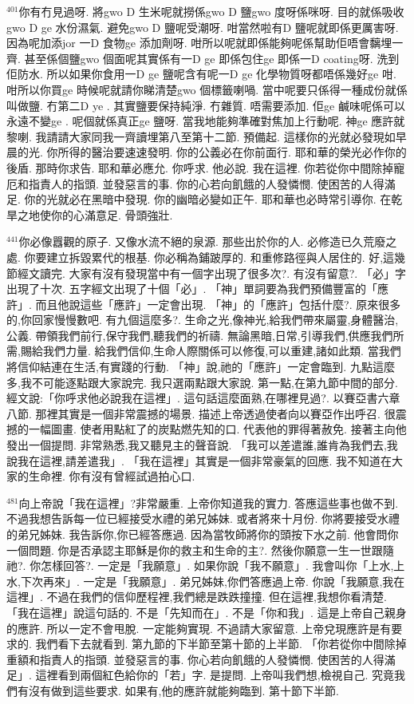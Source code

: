 \documentclass{book}
\begin{document}
$^{401}$你有冇見過呀.
將gwo D 生米呢就撈係gwo D 鹽gwo 度呀係咪呀.
目的就係吸收gwo D ge 水份濕氣.
避免gwo D 鹽呢受潮呀.
咁當然啦有D 鹽呢就即係更厲害呀.
因為呢加添jor 一D 食物ge 添加劑呀.
咁所以呢就即係能夠呢係幫助佢唔會黐埋一齊.
甚至係個鹽gwo 個面呢其實係有一D ge 即係包住ge 即係一D coating呀.
洗到佢防水.
所以如果你食用一D ge 鹽呢含有呢一D ge 化學物質呀都唔係幾好ge 咁.
咁所以你買ge 時候呢就請你睇清楚gwo 個標籤喇喎.
當中呢要只係得一種成份就係叫做鹽.
冇第二D ye .
其實鹽要保持純淨.
冇雜質.
唔需要添加.
佢ge 鹹味呢係可以永遠不變ge .
呢個就係真正ge 鹽呀.
當我地能夠準確對焦加上行動呢.
神ge 應許就黎喇.
我請請大家同我一齊讀埋第八至第十二節.
預備起.
這樣你的光就必發現如早晨的光.
你所得的醫治要速速發明.
你的公義必在你前面行.
耶和華的榮光必作你的後盾.
那時你求告.
耶和華必應允.
你呼求.
他必說.
我在這裡.
你若從你中間除掉寵厄和指責人的指頭.
並發惡言的事.
你的心若向飢餓的人發憐憫.
使困苦的人得滿足.
你的光就必在黑暗中發現.
你的幽暗必變如正午.
耶和華也必時常引導你.
在乾旱之地使你的心滿意足.
骨頭強壯.

$^{441}$你必像囂觀的原子.
又像水流不絕的泉源.
那些出於你的人.
必修造已久荒廢之處.
你要建立拆毀累代的根基.
你必稱為鋪跛厚的.
和重修路徑與人居住的.
好,這幾節經文讀完.
大家有沒有發現當中有一個字出現了很多次?.
有沒有留意?.
「必」字出現了十次.
五字經文出現了十個「必」.
「神」單詞要為我們預備豐富的「應許」.
而且他說這些「應許」一定會出現.
「神」的「應許」包括什麼?.
原來很多的,你回家慢慢數吧.
有九個這麼多?.
生命之光,像神光,給我們帶來屬靈,身體醫治,公義.
帶領我們前行,保守我們,聽我們的祈禱.
無論黑暗,日常,引導我們,供應我們所需,賜給我們力量.
給我們信仰,生命人際關係可以修復,可以重建,諸如此類.
當我們將信仰結連在生活,有實踐的行動.
「神」說,祂的「應許」一定會臨到.
九點這麼多,我不可能逐點跟大家說完.
我只選兩點跟大家說.
第一點,在第九節中間的部分.
經文說:「你呼求他必說我在這裡」.
這句話這麼面熟,在哪裡見過?.
以賽亞書六章八節.
那裡其實是一個非常震撼的場景.
描述上帝透過使者向以賽亞作出呼召.
很震撼的一幅圖畫.
使者用點紅了的炭點燃先知的口.
代表他的罪得著赦免.
接著主向他發出一個提問.
非常熟悉,我又聽見主的聲音說.
「我可以差遣誰,誰肯為我們去,我說我在這裡,請差遣我」.
「我在這裡」其實是一個非常豪氣的回應.
我不知道在大家的生命裡.
你有沒有曾經試過拍心口.

$^{481}$向上帝說「我在這裡」?非常嚴重.
上帝你知道我的實力.
答應這些事也做不到.
不過我想告訴每一位已經接受水禮的弟兄姊妹.
或者將來十月份.
你將要接受水禮的弟兄姊妹.
我告訴你,你已經答應過.
因為當牧師將你的頭按下水之前.
他會問你一個問題.
你是否承認主耶穌是你的救主和生命的主?.
然後你願意一生一世跟隨祂?.
你怎樣回答?.
一定是「我願意」.
如果你說「我不願意」.
我會叫你「上水,上水,下次再來」.
一定是「我願意」.
弟兄姊妹,你們答應過上帝.
你說「我願意,我在這裡」.
不過在我們的信仰歷程裡,我們總是跌跌撞撞.
但在這裡,我想你看清楚.
「我在這裡」說這句話的.
不是「先知而在」.
不是「你和我」.
這是上帝自己親身的應許.
所以一定不會甩脫.
一定能夠實現.
不過請大家留意.
上帝兌現應許是有要求的.
我們看下去就看到.
第九節的下半節至第十節的上半節.
「你若從你中間除掉重額和指責人的指頭.
並發惡言的事.
你心若向飢餓的人發憐憫.
使困苦的人得滿足」.
這裡看到兩個紅色給你的「若」字.
是提問.
上帝叫我們想,檢視自己.
究竟我們有沒有做到這些要求.
如果有,他的應許就能夠臨到.
第十節下半節.
\end{document}
